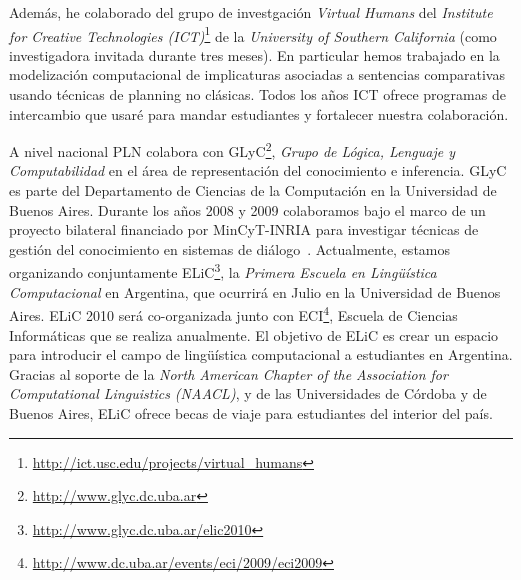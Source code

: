 \documentclass[11pt]{article}
\begin{document}
Adem\'as, he colaborado del grupo de investgaci\'on \emph{Virtual Humans} del
\emph{Institute for Creative
Technologies (ICT)}\footnote{\url{http://ict.usc.edu/projects/virtual_humans}}
de la \emph{University of Southern California} (como investigadora invitada
durante tres meses). En particular hemos trabajado en la modelizaci\'on
computacional de implicaturas asociadas a sentencias comparativas usando
t\'ecnicas de planning no cl\'asicas. Todos los a\~nos ICT ofrece programas de
intercambio que usar\'e para mandar estudiantes y fortalecer nuestra
colaboraci\'on. 



A nivel nacional PLN colabora con
GLyC\footnote{\url{http://www.glyc.dc.uba.ar}}, \emph{Grupo de L\'ogica,
Lenguaje y Computabilidad} en el \'area de representaci\'on del conocimiento e
inferencia. GLyC es parte del Departamento de Ciencias de la Computaci\'on en
la Universidad de Buenos Aires. Durante los a\~nos 2008 y 2009 colaboramos bajo
el marco de un proyecto bilateral financiado por MinCyT-INRIA para investigar
t\'ecnicas de gesti\'on del conocimiento en sistemas de
di\'alogo~\cite{benotti10b}. Actualmente, estamos organizando conjuntamente
ELiC\footnote{\url{http://www.glyc.dc.uba.ar/elic2010}}, 
la \emph{Primera Escuela en Ling\"u\'istica Computacional} en Argentina, que
ocurrir\'a en Julio en la Universidad de Buenos Aires.  ELiC 2010 ser\'a
co-organizada junto con 
ECI\footnote{\url{http://www.dc.uba.ar/events/eci/2009/eci2009}},
Escuela de Ciencias Inform\'aticas que se realiza anualmente. 
El objetivo de ELiC es crear un espacio para introducir el
campo de ling\"u\'istica computacional a estudiantes en Argentina. Gracias al
soporte de la \emph{North American Chapter of the Association for
Computational Linguistics (NAACL)}, y de las Universidades de C\'ordoba y de
Buenos Aires, ELiC ofrece becas de viaje para estudiantes del interior del
pa\'is.
\end{document}
